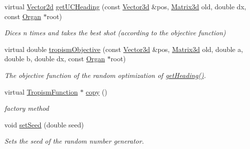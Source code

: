\begin{DoxyCompactItemize}
\item 
\mbox{\label{classCPlantBox_1_1TropismFunction_aa9187e118166528d14d4092e4a8a799e}} 
virtual \hyperlink{classCPlantBox_1_1Vector2d}{Vector2d} \hyperlink{classCPlantBox_1_1TropismFunction_aa9187e118166528d14d4092e4a8a799e}{get\+U\+C\+Heading} (const \hyperlink{classCPlantBox_1_1Vector3d}{Vector3d} \&pos, \hyperlink{classCPlantBox_1_1Matrix3d}{Matrix3d} old, double dx, const \hyperlink{classCPlantBox_1_1Organ}{Organ} $\ast$root)
\begin{DoxyCompactList}\small\item\em Dices n times and takes the best shot (according to the objective function) \end{DoxyCompactList}\item 
virtual double \hyperlink{classCPlantBox_1_1TropismFunction_a4f2c79fff55d1398c98a070dd8ebbe08}{tropism\+Objective} (const \hyperlink{classCPlantBox_1_1Vector3d}{Vector3d} \&pos, \hyperlink{classCPlantBox_1_1Matrix3d}{Matrix3d} old, double a, double b, double dx, const \hyperlink{classCPlantBox_1_1Organ}{Organ} $\ast$root)
\begin{DoxyCompactList}\small\item\em The objective function of the random optimization of \hyperlink{classCPlantBox_1_1TropismFunction_adb52b88734a94fe1365a00e02c7e6be5}{get\+Heading()}. \end{DoxyCompactList}\item 
\mbox{\label{classCPlantBox_1_1TropismFunction_a95539470cb607e2827600c2d3bfb8efa}} 
virtual \hyperlink{classCPlantBox_1_1TropismFunction}{Tropism\+Function} $\ast$ \hyperlink{classCPlantBox_1_1TropismFunction_a95539470cb607e2827600c2d3bfb8efa}{copy} ()
\begin{DoxyCompactList}\small\item\em factory method \end{DoxyCompactList}\item 
\mbox{\label{classCPlantBox_1_1TropismFunction_acfd2a088bdd98d07a0948fb3bf4aa12c}} 
void \hyperlink{classCPlantBox_1_1TropismFunction_acfd2a088bdd98d07a0948fb3bf4aa12c}{set\+Seed} (double seed)
\begin{DoxyCompactList}\small\item\em Sets the seed of the random number generator. \end{DoxyCompactList}\item 

\end{DoxyCompactItemize}
